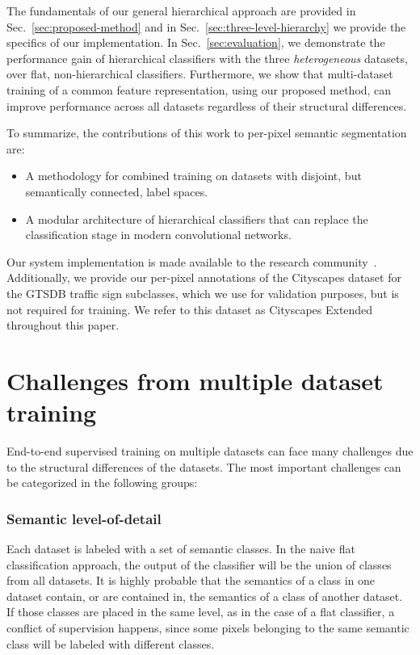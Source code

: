 \documentclass[letterpaper, 10 pt, conference]{ieeeconf}
\begin{document}
The fundamentals of our general hierarchical approach are provided in Sec.~\ref{sec:proposed-method} and in Sec.~\ref{sec:three-level-hierarchy} we provide the specifics of our implementation. In Sec.~\ref{sec:evaluation}, we demonstrate the performance gain of hierarchical classifiers with the three \textit{heterogeneous} datasets, over flat, non-hierarchical classifiers. Furthermore, we show that multi-dataset training of a common feature representation, using our proposed method, can improve performance across all datasets regardless of their structural differences.

To summarize, the contributions of this work to per-pixel semantic segmentation are:
\begin{itemize}
	\item A methodology for combined training on datasets with disjoint, but semantically connected, label spaces.
	\item A modular architecture of hierarchical classifiers that can replace the classification stage in modern convolutional networks.
\end{itemize}

Our system implementation is made available to the research community~\cite{panos2017code}. Additionally, we provide our per-pixel annotations of the Cityscapes dataset for the GTSDB traffic sign subclasses, which we use for validation purposes, but is not required for training. We refer to this dataset as Cityscapes Extended throughout this paper.


\section{Challenges from multiple dataset training}
\label{sec:challenges}
End-to-end supervised training on multiple datasets can face many challenges due to the structural differences of the datasets. The most important challenges can be categorized in the following groups:

\subsubsection*{\textbf{Semantic level-of-detail}}
\label{sec:semantic-level-of-detail}
Each dataset is labeled with a set of semantic classes. In the naive flat classification approach, the output of the classifier will be the union of classes from all datasets. It is highly probable that the semantics of a class in one dataset contain, or are contained in, the semantics of a class of another dataset. If those classes are placed in the same level, as in the case of a flat classifier, a conflict of supervision happens, since some pixels belonging to the same semantic class will be labeled with different classes.
\end{document}
